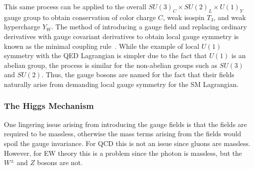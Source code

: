 This same process can be applied to the overall $SU(3)_C\times SU(2)_L\times U(1)_Y$ gauge group to obtain conservation of color charge $C$, weak isospin $T_3$, and weak hypercharge $Y_W$.
The method of introducing a gauge field and replacing ordinary derivatives with gauge covariant derivatives to obtain local gauge symmetry is known as the minimal coupling rule~\cite{cheng1984}.
While the example of local $U(1)$ symmetry with the QED Lagrangian is simpler due to the fact that $U(1)$ is an abelian group, the process is similar for the non-abelian groups such as $SU(3)$ and $SU(2)$.
Thus, the gauge bosons are named for the fact that their fields naturally arise from demanding local gauge symmetry for the SM Lagrangian.

\subsubsection{The Higgs Mechanism}

One lingering issue arising from introducing the gauge fields is that the fields are required to be massless, otherwise the mass terms arising from the fields would spoil the gauge invariance.
For QCD this is not an issue since gluons are massless.
However, for EW theory this is a problem since the photon is massless, but the $W^\pm$ and $Z$ bosons are not.

